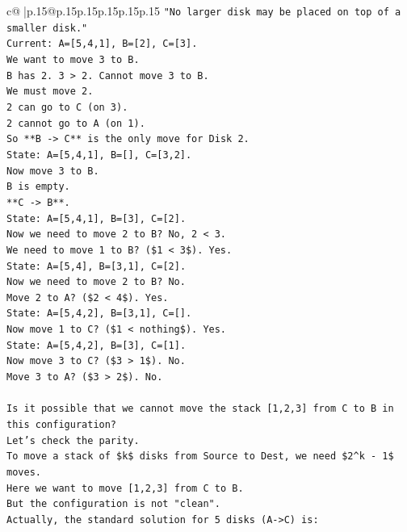 \documentclass{article}
\begin{document}
{\begin{supertabular}{c@{$\;$}|p{.15\linewidth}@{}p{.15\linewidth}p{.15\linewidth}p{.15\linewidth}p{.15\linewidth}p{.15\linewidth}}
{{{\texttt{"No larger disk may be placed on top of a smaller disk."} \\
\texttt{Current: A={[}5,4,1{]}, B={[}2{]}, C={[}3{]}.} \\
\texttt{We want to move 3 to B.} \\
\texttt{B has 2. 3 > 2. Cannot move 3 to B.} \\
\texttt{We must move 2.} \\
\texttt{2 can go to C (on 3).} \\
\texttt{2 cannot go to A (on 1).} \\
\texttt{So **B {-}> C** is the only move for Disk 2.} \\
\texttt{State: A={[}5,4,1{]}, B={[}{]}, C={[}3,2{]}.} \\
\texttt{Now move 3 to B.} \\
\texttt{B is empty.} \\
\texttt{**C {-}> B**.} \\
\texttt{State: A={[}5,4,1{]}, B={[}3{]}, C={[}2{]}.} \\
\texttt{Now we need to move 2 to B? No, 2 < 3.} \\
\texttt{We need to move 1 to B? (\$1 < 3\$). Yes.} \\
\texttt{State: A={[}5,4{]}, B={[}3,1{]}, C={[}2{]}.} \\
\texttt{Now we need to move 2 to B? No.} \\
\texttt{Move 2 to A? (\$2 < 4\$). Yes.} \\
\texttt{State: A={[}5,4,2{]}, B={[}3,1{]}, C={[}{]}.} \\
\texttt{Now move 1 to C? (\$1 < nothing\$). Yes.} \\
\texttt{State: A={[}5,4,2{]}, B={[}3{]}, C={[}1{]}.} \\
\texttt{Now move 3 to C? (\$3 > 1\$). No.} \\
\texttt{Move 3 to A? (\$3 > 2\$). No.} \\
\\ 
\texttt{Is it possible that we cannot move the stack {[}1,2,3{]} from C to B in this configuration?} \\
\texttt{Let's check the parity.} \\
\texttt{To move a stack of \$k\$ disks from Source to Dest, we need \$2\^{}k {-} 1\$ moves.} \\
\texttt{Here we want to move {[}1,2,3{]} from C to B.} \\
\texttt{But the configuration is not "clean".} \\
\texttt{Actually, the standard solution for 5 disks (A{-}>C) is:} \\
}}}
\end{supertabular}}
\end{document}

